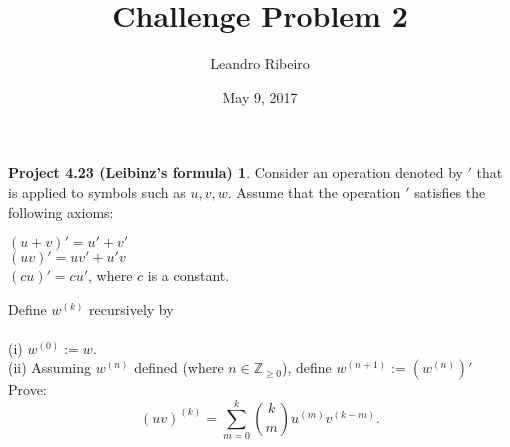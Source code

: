 \documentclass[12pt]{amsart}
\newcommand{\Z}{\mathbb{Z}}
\begin{document}
\title{Challenge Problem 2}
\date{May 9, 2017}
\author{Leandro Ribeiro}

\maketitle

\theoremstyle{definition}
\newtheorem*{prop}{Project 4.23 (Leibinz's formula)}
\begin{prop}
	Consider an operation denoted by $'$ that is applied to symbols such as $u, v, w$. Assume that the operation $'$ satisfies the following axioms:
	\\\begin{center} $(u+v)' = u' + v'$
	\\ $(uv)' = uv' + u'v$
	\\ $(cu)' = cu'$, where $c$ is a constant.
	\end{center}
	Define $w^{(k)}$ recursively by
	\\\\(i) $w^{(0)} := w.$
	\\(ii) Assuming $w^{(n)}$ defined (where $n \in \Z_{\geq 0}$), define $w^{(n+1)} := (w^{(n)})'$
	\\
	Prove: $$(uv)^{(k)} = \sum_{m=0}^{k} {{k}\choose{m}} u^{(m)}v^{(k-m)}.$$
\end{prop}
\end{document}
